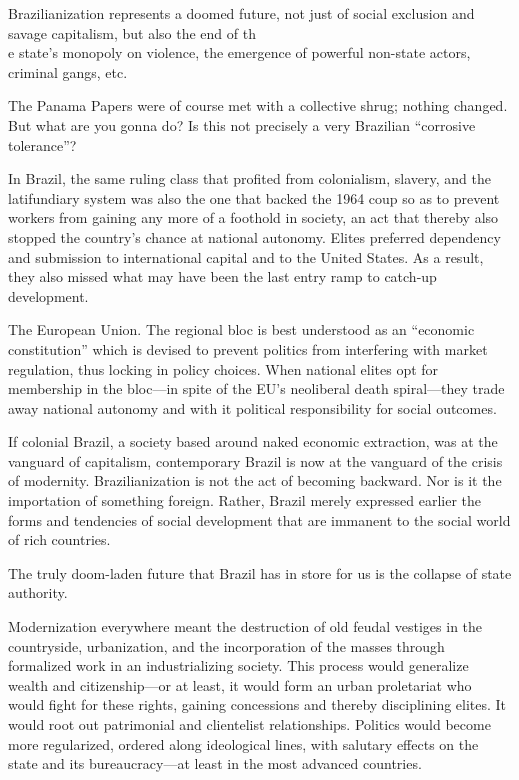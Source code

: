 \documentclass[
]{book}
\begin{document}
Brazilianization represents a doomed future, not just of social exclusion and savage capitalism, but also the end of th\\
e state's monopoly on violence, the emergence of powerful non-state actors, criminal gangs, etc.

The Panama Papers were of course met with a collective shrug; nothing changed. But what are you gonna do? Is this not precisely a very Brazilian ``corrosive tolerance''?

In Brazil, the same ruling class that profited from colonialism, slavery, and the latifundiary system was also the one that backed the 1964 coup so as to prevent workers from gaining any more of a foothold in society, an act that thereby also stopped the country's chance at national autonomy. Elites preferred dependency and sub­mission to international capital and to the United States. As a result, they also missed what may have been the last entry ramp to catch-up development.

The European Union. The regional bloc is best understood as an ``economic constitution'' which is devised to prevent politics from interfering with market regulation, thus locking in policy choices.
When national elites opt for membership in the bloc---in spite of the EU's neoliberal death spiral---they trade away national autonomy and with it political responsibility for social outcomes.

If colonial Brazil, a society based around naked economic extrac­tion, was at the vanguard of capitalism, contemporary Brazil is now at the vanguard of the crisis of modernity. Brazilianization is not the act of becoming backward. Nor is it the importation of something for­eign. Rather, Brazil merely expressed earlier the forms and tendencies of social development that are immanent to the social world of rich countries.

The truly doom-laden future that Brazil has in store for us is the collapse of state authority.

Modernization everywhere meant the destruction of old feudal ves­tiges in the countryside, urbanization, and the incorporation of the masses through formalized work in an industrializing society. This process would generalize wealth and citizenship---or at least, it would form an urban proletariat who would fight for these rights, gaining concessions and thereby disciplining elites. It would root out patri­monial and clientelist relationships. Politics would become more regularized, ordered along ideological lines, with salutary effects on the state and its bureaucracy---at least in the most advanced countries.
\end{document}
